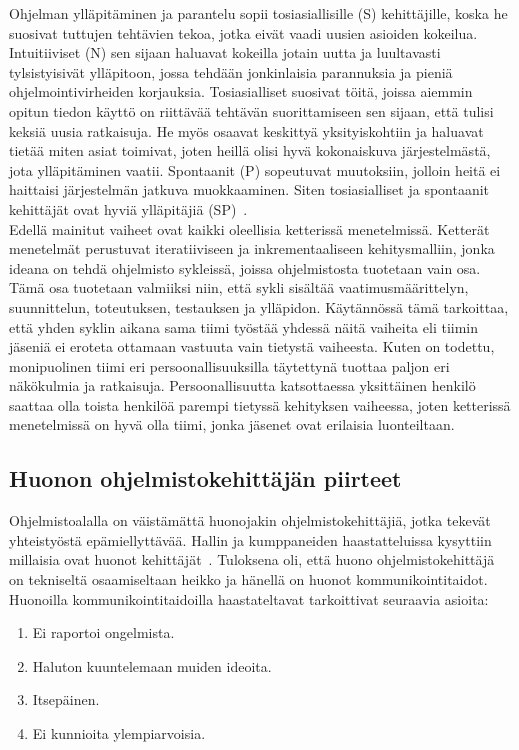 \documentclass[finnish]{../tktltiki2}
\theoremstyle{definition}
\theoremstyle{remark}
\begin{document}
Ohjelman ylläpitäminen ja parantelu sopii tosiasiallisille (S) kehittäjille, koska he suosivat tuttujen tehtävien tekoa, jotka eivät vaadi uusien asioiden kokeilua. Intuitiiviset (N) sen sijaan haluavat kokeilla jotain uutta ja luultavasti tylsistyisivät ylläpitoon, jossa tehdään jonkinlaisia parannuksia ja pieniä ohjelmointivirheiden korjauksia. Tosiasialliset suosivat töitä, joissa aiemmin opitun tiedon käyttö on riittävää tehtävän suorittamiseen sen sijaan, että tulisi keksiä uusia ratkaisuja. He myös osaavat keskittyä yksityiskohtiin ja haluavat tietää miten asiat toimivat, joten heillä olisi hyvä kokonaiskuva järjestelmästä, jota ylläpitäminen vaatii. Spontaanit (P) sopeutuvat muutoksiin, jolloin heitä ei haittaisi järjestelmän jatkuva muokkaaminen. Siten tosiasialliset ja spontaanit kehittäjät ovat hyviä ylläpitäjiä (SP)~\cite{Capretz:2010:MSS:1726559.1726574}.\\

Edellä mainitut vaiheet ovat kaikki oleellisia ketterissä menetelmissä. Ketterät menetelmät perustuvat iteratiiviseen ja inkrementaaliseen kehitysmalliin, jonka ideana on tehdä ohjelmisto sykleissä, joissa ohjelmistosta tuotetaan vain osa. Tämä osa tuotetaan valmiiksi niin, että sykli sisältää vaatimusmäärittelyn, suunnittelun, toteutuksen, testauksen ja ylläpidon. Käytännössä tämä tarkoittaa, että yhden syklin aikana sama tiimi työstää yhdessä näitä vaiheita eli tiimin jäseniä ei eroteta ottamaan vastuuta vain tietystä vaiheesta. Kuten on todettu, monipuolinen tiimi eri persoonallisuuksilla täytettynä tuottaa paljon eri näkökulmia ja ratkaisuja. Persoonallisuutta katsottaessa yksittäinen henkilö saattaa olla toista henkilöä parempi tietyssä kehityksen vaiheessa, joten ketterissä menetelmissä on hyvä olla tiimi, jonka jäsenet ovat erilaisia luonteiltaan.

\subsection{Huonon ohjelmistokehittäjän piirteet}

Ohjelmistoalalla on väistämättä huonojakin ohjelmistokehittäjiä, jotka
tekevät yhteistyöstä epämiellyttävää. Hallin ja kumppaneiden haastatteluissa kysyttiin millaisia ovat huonot kehittäjät~\cite{Hall:2007:CNT:1235000.1235043}. Tuloksena oli, että huono ohjelmistokehittäjä on tekniseltä osaamiseltaan heikko ja hänellä on huonot kommunikointitaidot. Huonoilla kommunikointitaidoilla haastateltavat tarkoittivat seuraavia asioita:

\begin{enumerate}

\item Ei raportoi ongelmista.
\item Haluton kuuntelemaan muiden ideoita.
\item Itsepäinen.
\item Ei kunnioita ylempiarvoisia.

\end{enumerate}
\end{document}
